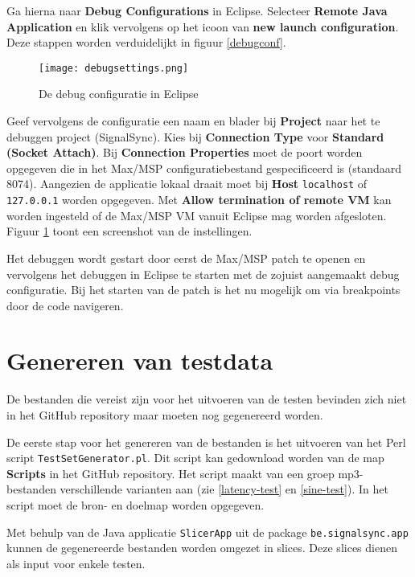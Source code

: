 Ga hierna naar \textbf{Debug Configurations} in Eclipse. Selecteer \textbf{Remote Java Application} en klik vervolgens op het icoon van \textbf{new launch configuration}. Deze stappen worden verduidelijkt in figuur \ref{debugconf}.

\begin{figure}[!tbph]
	\captionsetup{width=0.7\textwidth}
	\caption{De debug configuratie in Eclipse}
	\begin{center}
		\advance\parskip0.3cm
		\texttt{[image: debugsettings.png]}
	\end{center}
	
	\label{debugsettings}
\end{figure}

Geef vervolgens de configuratie een naam en blader bij \textbf{Project} naar het te debuggen project (SignalSync). Kies bij \textbf{Connection Type} voor \textbf{Standard (Socket Attach)}. Bij \textbf{Connection Properties} moet de poort worden opgegeven die in het Max/MSP configuratiebestand gespecificeerd is (standaard 8074). Aangezien de applicatie lokaal draait moet bij \textbf{Host} \texttt{localhost} of \texttt{127.0.0.1} worden opgegeven. Met \textbf{Allow termination of remote VM} kan worden ingesteld of de Max/MSP VM vanuit Eclipse mag worden afgesloten. Figuur \ref{debugsettings} toont een screenshot van de instellingen.

Het debuggen wordt gestart door eerst de Max/MSP patch te openen en vervolgens het debuggen in Eclipse te starten met de zojuist aangemaakt debug configuratie. Bij het starten van de patch is het nu mogelijk om via breakpoints door de code navigeren.

\section*{Genereren van testdata}

De bestanden die vereist zijn voor het uitvoeren van de testen bevinden zich niet in het GitHub repository maar moeten nog gegenereerd worden. 

De eerste stap voor het genereren van de bestanden is het uitvoeren van het Perl script \texttt{TestSetGenerator.pl}. Dit script kan gedownload worden van de map \textbf{Scripts} in het GitHub repository. Het script maakt van een groep mp3-bestanden verschillende varianten aan (zie \ref{latency-test} en \ref{sine-test}). In het script moet de bron- en doelmap worden opgegeven.

Met behulp van de Java applicatie \texttt{SlicerApp} uit de package \texttt{be.signalsync.app} kunnen de gegenereerde bestanden worden omgezet in slices. Deze slices dienen als input voor enkele testen.


